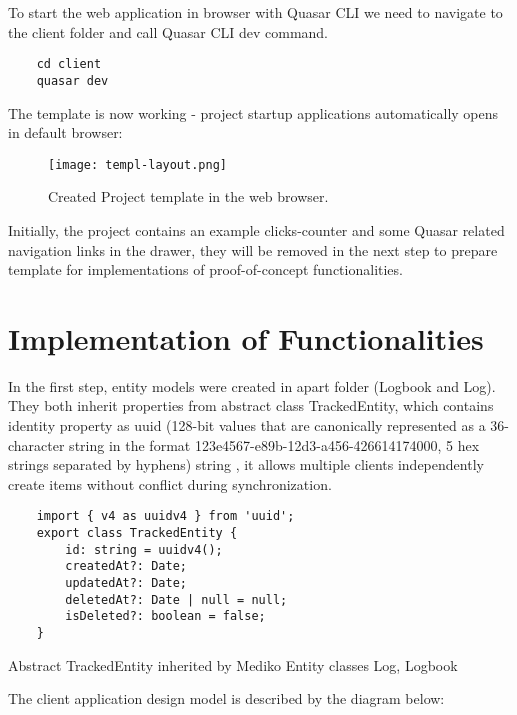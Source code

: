 To start the web application in browser with Quasar CLI we need to navigate to the client folder and call Quasar CLI dev command.

\begin{verbatim}
    cd client
    quasar dev
\end{verbatim}

The template is now working - project startup applications automatically opens in default browser:

\begin{figure} [H]
    \centering
    \texttt{[image: templ-layout.png]}
    \caption[Client Template]{\label{fig:template}Created Project template in the web browser.}
\end{figure}

Initially, the project contains an example clicks-counter and some Quasar related navigation links in the drawer, they will be removed in the next step to prepare template for implementations of proof-of-concept functionalities.


\section{{Implementation of Functionalities}}%
\label{sec:functionalities}

In the first step, entity models were created in apart folder (Logbook and Log). They both inherit properties from abstract class TrackedEntity, which contains identity property as uuid (128-bit values that are canonically represented as a 36-character string in the format 123e4567-e89b-12d3-a456-426614174000, 5 hex strings separated by hyphens) string \autocite{UUID}, it allows multiple clients independently create items without conflict during synchronization.

\begin{listing}[H]
    \begin{verbatim}
    import { v4 as uuidv4 } from 'uuid';
    export class TrackedEntity {
        id: string = uuidv4();
        createdAt?: Date;
        updatedAt?: Date;
        deletedAt?: Date | null = null;
        isDeleted?: boolean = false;
    }
    \end{verbatim}
\caption[Tracked Entity]{Abstract TrackedEntity inherited by Mediko Entity classes Log, Logbook}
\end{listing}


The client application design model is described by the diagram below:

